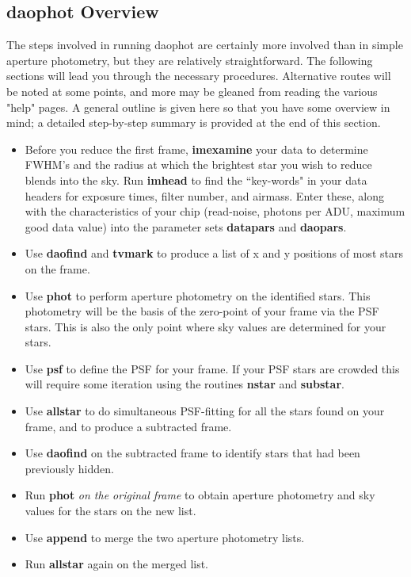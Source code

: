 \subsection{{\bf daophot}
Overview}
The steps involved in running daophot are certainly more involved than
in simple aperture photometry, but they are relatively straightforward.
The following sections will lead you through the necessary procedures.
Alternative routes will be noted at some points, and more may be gleaned
from reading the various "help" pages.  A general outline is given here
so that you have some overview in mind; a detailed step-by-step summary
is provided at the end of this section.  
 
\begin{itemize}
\item Before you reduce the first frame, {\bf imexamine}  your data to
determine FWHM's and the radius at which the brightest star you wish to
reduce blends into the sky.  Run {\bf imhead} to find the ``key-words"
in your data headers for exposure times, filter number, and airmass.
Enter these, along with the characteristics of your chip (read-noise,
photons per ADU, maximum good data value) 
into the parameter sets {\bf datapars} and {\bf
daopars}.
\item Use {\bf daofind} and {\bf tvmark} 
to produce a list of x and y positions of most
stars on the frame.
\item Use {\bf phot} to perform aperture photometry on the identified
stars.  This photometry will be the basis of the zero-point of
your frame via the PSF stars. This is also the only point where sky
values are determined for your stars.
\item Use {\bf psf} to define the PSF for your frame.  If your PSF stars are crowded this
will require some iteration using the routines {\bf nstar} and {\bf
substar}.
\item Use {\bf allstar} to do simultaneous PSF-fitting for all the stars
found on your frame, and to produce a subtracted frame.
\item Use {\bf
daofind} on the subtracted frame to identify stars that had been
previously hidden.  
\item Run {\bf phot} {\it on the original frame} to obtain aperture photometry
and sky values for the stars on the new list.
\item Use {\bf append} to merge the two aperture photometry lists.
\item Run {\bf allstar} again on the merged list.
\end{itemize}

